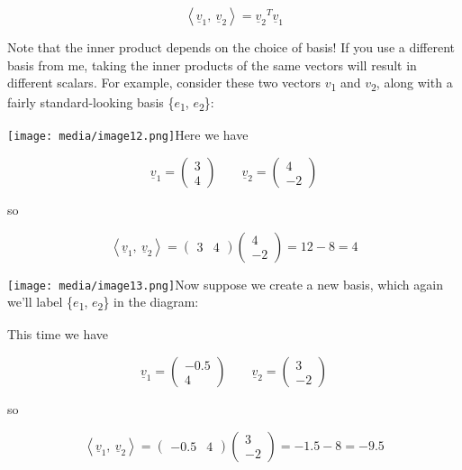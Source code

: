 \documentclass[oneside,english]{amsbook}
\numberwithin{section}{chapter}
\theoremstyle{plain}
\theoremstyle{definition}
\begin{document}
\[\left\langle {\underline{v}}_{1},\ {\underline{v}}_{2} \right\rangle = {{\underline{v}}_{2}}^{T}{\underline{v}}_{1}\]

Note that the inner product depends on the choice of basis! If you use a
different basis from me, taking the inner products of the same vectors
will result in different scalars. For example, consider these two
vectors $v$\textsubscript{1} and $v$\textsubscript{2}, along with
a fairly standard-looking basis \{$e$\textsubscript{1},
$e$\textsubscript{2}\}:

\texttt{[image: media/image12.png]}Here
we have

\[{\underline{v}}_{1} = \begin{pmatrix}
	3 \\
	4
\end{pmatrix}\ \ \ \ \ \ \ \ \ {\underline{v}}_{2} = \begin{pmatrix}
	4 \\
	- 2
\end{pmatrix}\]

so

\[\left\langle {\underline{v}}_{1},\ {\underline{v}}_{2} \right\rangle = \begin{pmatrix}
	3 & 4
\end{pmatrix}\begin{pmatrix}
	4 \\
	- 2
\end{pmatrix} = 12 - 8 = 4\]

\texttt{[image: media/image13.png]}Now
suppose we create a new basis, which again we'll label
\{$e$\textsubscript{1}, $e$\textsubscript{2}\} in the diagram:

This time we have

\[{\underline{v}}_{1} = \begin{pmatrix}
	- 0.5 \\
	4
\end{pmatrix}\ \ \ \ \ \ \ \ \ {\underline{v}}_{2} = \begin{pmatrix}
	3 \\
	- 2
\end{pmatrix}\]

so

\[\left\langle {\underline{v}}_{1},\ {\underline{v}}_{2} \right\rangle = \begin{pmatrix}
	- 0.5 & 4
\end{pmatrix}\begin{pmatrix}
	3 \\
	- 2
\end{pmatrix} = - 1.5 - 8 = - 9.5\]
\end{document}
